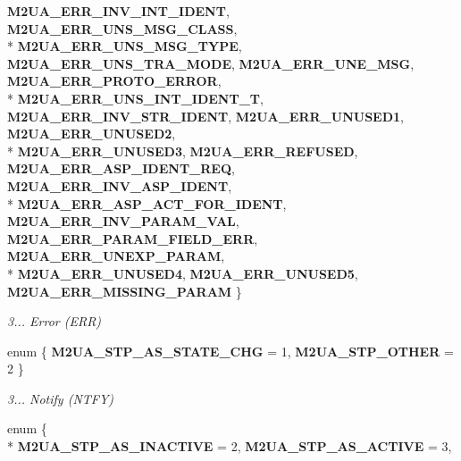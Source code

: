 \begin{DoxyCompactItemize}
{\bf M2\+U\+A\+\_\+\+E\+R\+R\+\_\+\+I\+N\+V\+\_\+\+I\+N\+T\+\_\+\+I\+D\+E\+NT}, 
{\bf M2\+U\+A\+\_\+\+E\+R\+R\+\_\+\+U\+N\+S\+\_\+\+M\+S\+G\+\_\+\+C\+L\+A\+SS}, 
\\*
{\bf M2\+U\+A\+\_\+\+E\+R\+R\+\_\+\+U\+N\+S\+\_\+\+M\+S\+G\+\_\+\+T\+Y\+PE}, 
{\bf M2\+U\+A\+\_\+\+E\+R\+R\+\_\+\+U\+N\+S\+\_\+\+T\+R\+A\+\_\+\+M\+O\+DE}, 
{\bf M2\+U\+A\+\_\+\+E\+R\+R\+\_\+\+U\+N\+E\+\_\+\+M\+SG}, 
{\bf M2\+U\+A\+\_\+\+E\+R\+R\+\_\+\+P\+R\+O\+T\+O\+\_\+\+E\+R\+R\+OR}, 
\\*
{\bf M2\+U\+A\+\_\+\+E\+R\+R\+\_\+\+U\+N\+S\+\_\+\+I\+N\+T\+\_\+\+I\+D\+E\+N\+T\+\_\+T}, 
{\bf M2\+U\+A\+\_\+\+E\+R\+R\+\_\+\+I\+N\+V\+\_\+\+S\+T\+R\+\_\+\+I\+D\+E\+NT}, 
{\bf M2\+U\+A\+\_\+\+E\+R\+R\+\_\+\+U\+N\+U\+S\+E\+D1}, 
{\bf M2\+U\+A\+\_\+\+E\+R\+R\+\_\+\+U\+N\+U\+S\+E\+D2}, 
\\*
{\bf M2\+U\+A\+\_\+\+E\+R\+R\+\_\+\+U\+N\+U\+S\+E\+D3}, 
{\bf M2\+U\+A\+\_\+\+E\+R\+R\+\_\+\+R\+E\+F\+U\+S\+ED}, 
{\bf M2\+U\+A\+\_\+\+E\+R\+R\+\_\+\+A\+S\+P\+\_\+\+I\+D\+E\+N\+T\+\_\+\+R\+EQ}, 
{\bf M2\+U\+A\+\_\+\+E\+R\+R\+\_\+\+I\+N\+V\+\_\+\+A\+S\+P\+\_\+\+I\+D\+E\+NT}, 
\\*
{\bf M2\+U\+A\+\_\+\+E\+R\+R\+\_\+\+A\+S\+P\+\_\+\+A\+C\+T\+\_\+\+F\+O\+R\+\_\+\+I\+D\+E\+NT}, 
{\bf M2\+U\+A\+\_\+\+E\+R\+R\+\_\+\+I\+N\+V\+\_\+\+P\+A\+R\+A\+M\+\_\+\+V\+AL}, 
{\bf M2\+U\+A\+\_\+\+E\+R\+R\+\_\+\+P\+A\+R\+A\+M\+\_\+\+F\+I\+E\+L\+D\+\_\+\+E\+RR}, 
{\bf M2\+U\+A\+\_\+\+E\+R\+R\+\_\+\+U\+N\+E\+X\+P\+\_\+\+P\+A\+R\+AM}, 
\\*
{\bf M2\+U\+A\+\_\+\+E\+R\+R\+\_\+\+U\+N\+U\+S\+E\+D4}, 
{\bf M2\+U\+A\+\_\+\+E\+R\+R\+\_\+\+U\+N\+U\+S\+E\+D5}, 
{\bf M2\+U\+A\+\_\+\+E\+R\+R\+\_\+\+M\+I\+S\+S\+I\+N\+G\+\_\+\+P\+A\+R\+AM}
 \}\begin{DoxyCompactList}\small\item\em 3... Error (E\+RR) \end{DoxyCompactList}
\item 
enum \{ {\bf M2\+U\+A\+\_\+\+S\+T\+P\+\_\+\+A\+S\+\_\+\+S\+T\+A\+T\+E\+\_\+\+C\+HG} = 1, 
{\bf M2\+U\+A\+\_\+\+S\+T\+P\+\_\+\+O\+T\+H\+ER} = 2
 \}\begin{DoxyCompactList}\small\item\em 3... Notify (N\+T\+FY) \end{DoxyCompactList}
\item 
enum \{ \\*
{\bf M2\+U\+A\+\_\+\+S\+T\+P\+\_\+\+A\+S\+\_\+\+I\+N\+A\+C\+T\+I\+VE} = 2, 
{\bf M2\+U\+A\+\_\+\+S\+T\+P\+\_\+\+A\+S\+\_\+\+A\+C\+T\+I\+VE} = 3, 

\end{DoxyCompactItemize}

